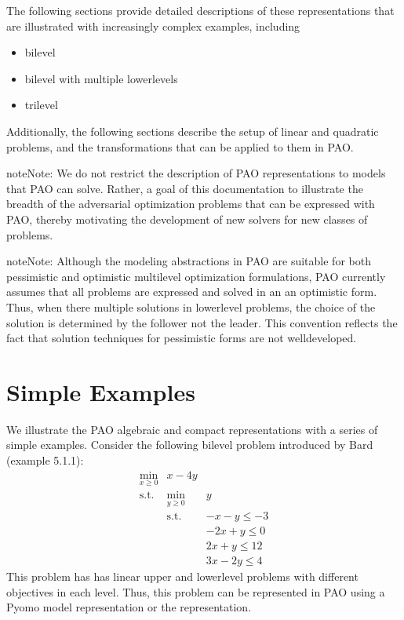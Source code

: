 \documentclass[letterpaper,10pt,english]{sphinxmanual}
\begin{document}
The following sections provide detailed descriptions of these
representations that are illustrated with increasingly complex examples,
including
\begin{itemize}
\item {} 
bilevel

\item {} 
bilevel with multiple lower\sphinxhyphen{}levels

\item {} 
trilevel

\end{itemize}

Additionally, the following sections describe the setup of linear and
quadratic problems, and the transformations that can be applied to them
in PAO.

\begin{sphinxadmonition}{note}{Note:}
We do not restrict the description of PAO representations to
models that PAO can solve. Rather, a goal of this documentation
to illustrate the breadth of the adversarial optimization problems
that can be expressed with PAO, thereby motivating the development
of new solvers for new classes of problems.
\end{sphinxadmonition}

\begin{sphinxadmonition}{note}{Note:}
Although the modeling abstractions in PAO are suitable for both
pessimistic and optimistic multilevel optimization formulations,
PAO currently assumes that all problems are expressed and solved
in an an optimistic form.  Thus, when there multiple solutions in
lower\sphinxhyphen{}level problems, the choice of the solution is determined by
the follower not the leader.  This convention reflects the fact that
solution techniques for pessimistic forms are not well\sphinxhyphen{}developed.
\end{sphinxadmonition}


\section{Simple Examples}
\label{\detokenize{examples:simple-examples}}\label{\detokenize{examples::doc}}
We illustrate the PAO algebraic and compact representations with a series
of simple examples.  Consider the following bilevel problem introduced
by Bard  (example 5.1.1):
 \begin{equation*}
 \begin{array}{lll}
 \min_{x \geq 0} & x - 4 y & \\
 \textrm{s.t.} & \min_{y \geq 0} & y\\
 & \textrm{s.t.} & -x -y \leq -3\\
 & & -2 x + y \leq 0\\
 & & 2 x + y \leq 12\\
 & & 3 x - 2 y \leq 4
 \end{array}
 \end{equation*}
This problem has has linear upper\sphinxhyphen{} and lower\sphinxhyphen{}level problems with different
objectives in each level.  Thus, this problem can be represented in
PAO using a Pyomo model representation or the 
representation.
\end{document}
